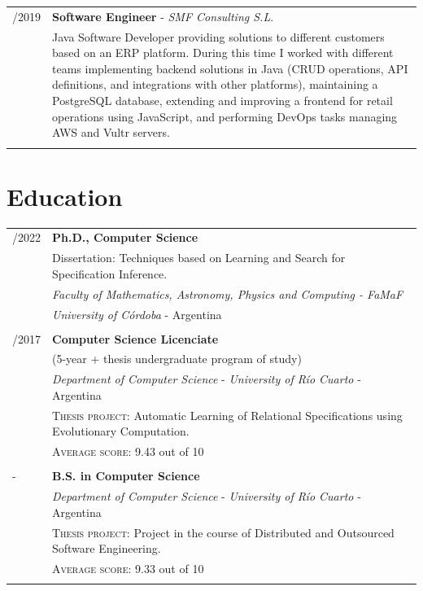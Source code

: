 \documentclass[a4paper,10pt]{article} %
\begin{document}
\begin{longtable}{>{\raggedleft\arraybackslash}p{} p{}}
2015/2019 & \textbf{Software Engineer} - \textit{SMF Consulting S.L}. \\ 
& Java Software Developer providing solutions to different customers based on an ERP platform. During this time I worked with different teams implementing backend solutions in Java (CRUD operations, API definitions, and integrations with other platforms), maintaining a PostgreSQL database, extending and improving a frontend for retail operations using JavaScript, and performing DevOps tasks managing AWS and Vultr servers. \\ & \\

\end{longtable}


\section{Education}

\begin{longtable}{>{\raggedleft\arraybackslash}p{} p{}}
\\
2017/2022 & \textbf{Ph.D., Computer Science} \\
& Dissertation: Techniques based on Learning and Search for Specification Inference. \\
& \textit{Faculty of Mathematics, Astronomy, Physics and Computing - FaMaF} \\ & \textit{University of Córdoba} - Argentina \\ & \\

2012/2017 & \textbf{Computer Science Licenciate} \\
& (5-year + thesis undergraduate program of study) \\
& \textit{Department of Computer Science} - \textit{University of Río Cuarto} - Argentina \\ 
& \textsc{Thesis project:} Automatic Learning of Relational Specifications using Evolutionary Computation. \\ 
& \textsc{Average score:} 9.43 out of 10 \\ & \\

2012 -	& \textbf{B.S. in Computer Science} \\
2014 & \textit{Department of Computer Science} - \textit{University of Río Cuarto} - Argentina \\
& \textsc{Thesis project:} Project in the course of Distributed and Outsourced Software Engineering. \\ 
& \textsc{Average score:} 9.33 out of 10 \\ \\ 

\end{longtable}
\end{document}
